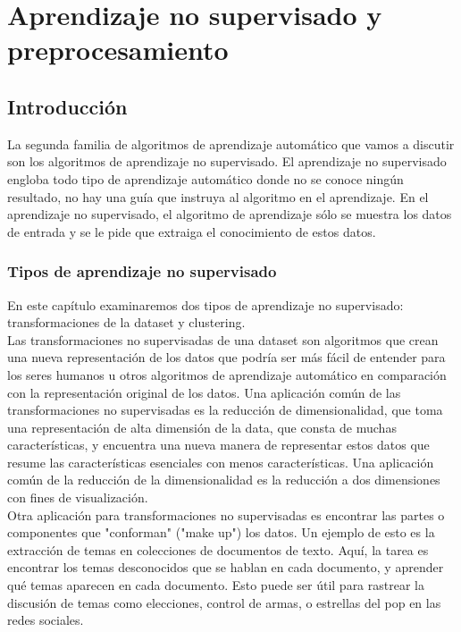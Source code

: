 





\renewcommand{\tablename}{Tabla}


\chapter{Aprendizaje no supervisado y preprocesamiento}{\label{Cap3}}




\section{Introducción}

La segunda familia de algoritmos de aprendizaje automático que vamos a discutir son los algoritmos de aprendizaje no supervisado. El aprendizaje no supervisado engloba todo tipo de aprendizaje automático donde no se conoce ningún resultado, no hay una guía  que instruya al algoritmo en el aprendizaje. En el aprendizaje no supervisado, el algoritmo de aprendizaje sólo se muestra los datos de entrada y se le pide que extraiga el conocimiento de estos datos.

\subsection{Tipos de aprendizaje no supervisado}



En este capítulo examinaremos dos tipos de aprendizaje no supervisado: transformaciones de la dataset y clustering. \\ 

Las transformaciones no supervisadas de una dataset  son algoritmos que crean una nueva representación de los datos que podría ser más fácil de entender para los seres humanos u otros algoritmos de aprendizaje automático en comparación con la representación original de los datos. 
Una aplicación común de las transformaciones no supervisadas es la reducción de dimensionalidad, que toma una representación de alta dimensión de la data, que consta de muchas características, y encuentra una nueva manera de representar estos datos que resume las características esenciales con menos características.  Una aplicación común de la reducción de la dimensionalidad es la reducción a dos dimensiones con fines de visualización.\\


Otra aplicación para transformaciones no supervisadas es encontrar las partes o componentes que    {}"{}conforman"{ } ("{}make up"{})  los datos. Un ejemplo de esto es la extracción de temas en colecciones de documentos de texto. Aquí, la tarea es encontrar los temas desconocidos que se hablan en cada documento, y aprender qué temas aparecen en cada documento. Esto puede ser útil para rastrear la discusión de temas como elecciones, control de armas, o estrellas del pop en las redes sociales.\\


